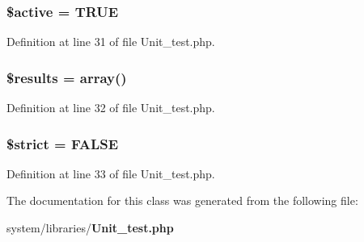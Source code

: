 \subsubsection[{\$active}]{\setlength{\rightskip}{0pt plus 5cm}\${\bf active} = T\-R\-U\-E}\label{class_c_i___unit__test_aacd1fa47b7ea59451aff98beca4360ae}


Definition at line 31 of file Unit\-\_\-test.\-php.

\subsubsection[{\$results}]{\setlength{\rightskip}{0pt plus 5cm}\$results = array()}\label{class_c_i___unit__test_a233d12bd8b6d3453e9a7a3f0b8c31db2}


Definition at line 32 of file Unit\-\_\-test.\-php.

\subsubsection[{\$strict}]{\setlength{\rightskip}{0pt plus 5cm}\$strict = F\-A\-L\-S\-E}\label{class_c_i___unit__test_a856bf794dded1ba70be4dfae635a1b06}


Definition at line 33 of file Unit\-\_\-test.\-php.



The documentation for this class was generated from the following file\-:\begin{DoxyCompactItemize}
\item 
system/libraries/{\bf Unit\-\_\-test.\-php}\end{DoxyCompactItemize}
